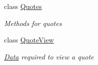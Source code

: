 \begin{DoxyCompactItemize}
class \mbox{\hyperlink{class_g_f_s_c_1_1_services_1_1_end_of_term_1_1_quotes}{Quotes}}
\begin{DoxyCompactList}\small\item\em Methods for quotes \end{DoxyCompactList}\item 
class \mbox{\hyperlink{class_g_f_s_c_1_1_services_1_1_end_of_term_1_1_quote_view}{Quote\+View}}
\begin{DoxyCompactList}\small\item\em \mbox{\hyperlink{namespace_g_f_s_c_1_1_services_1_1_end_of_term_1_1_data}{Data}} required to view a quote \end{DoxyCompactList}\end{DoxyCompactItemize}
